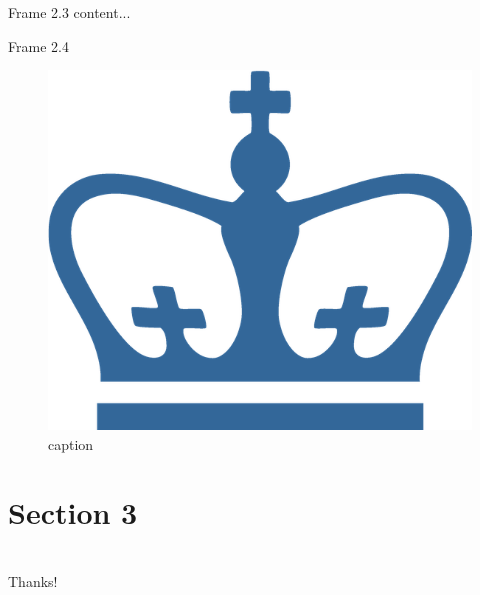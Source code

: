 \documentclass[xcolor=svgnames]{beamer}
\begin{document}
\begin{frame}{Frame 2.3}
	content...
\end{frame}

\begin{frame}{Frame 2.4}
	\begin{figure}[h]
	\centering
	\caption{caption}
	\includegraphics[width=.3\linewidth]{CUCrown_blue}
	\end{figure}
\end{frame}

\section{Section 3}

\lastrealframe

\section{}
\begin{frame}
	  \centering \Huge
  Thanks!
\end{frame}
\end{document}
